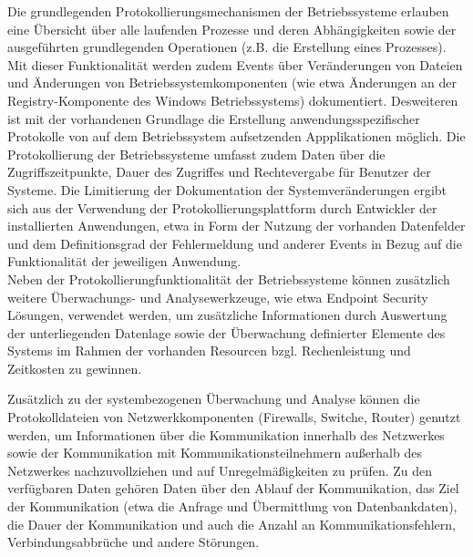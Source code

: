 Die grundlegenden Protokollierungsmechanismen der Betriebssysteme erlauben eine Übersicht über alle laufenden Prozesse und deren Abhängigkeiten sowie der ausgeführten grundlegenden Operationen (z.B. die Erstellung eines Prozesses). Mit dieser Funktionalität werden zudem Events über Veränderungen von Dateien und Änderungen von Betriebssystemkomponenten (wie etwa Änderungen an der Registry-Komponente des Windows Betriebssystems) dokumentiert. Desweiteren ist mit der vorhandenen Grundlage die Erstellung anwendungsspezifischer Protokolle von auf dem Betriebssystem aufsetzenden Appplikationen möglich. Die Protokollierung der Betriebssysteme umfasst zudem Daten über die Zugriffszeitpunkte, Dauer des Zugriffes und Rechtevergabe für Benutzer der Systeme. 
Die Limitierung der Dokumentation der Systemveränderungen ergibt sich aus der Verwendung der Protokollierungsplattform durch Entwickler der installierten Anwendungen, etwa in Form der Nutzung der vorhanden Datenfelder und dem Definitionsgrad der Fehlermeldung und anderer Events in Bezug auf die Funktionalität der jeweiligen Anwendung.\\ 

Neben der Protokollierungfunktionalität der Betriebssysteme können zusätzlich weitere Überwachungs- und Analysewerkzeuge, wie etwa Endpoint Security Lösungen, verwendet werden, um zusätzliche Informationen durch Auswertung der unterliegenden Datenlage sowie der Überwachung definierter Elemente des Systems im Rahmen der vorhanden Resourcen bzgl. Rechenleistung und Zeitkosten zu gewinnen. 

Zusätzlich zu der systembezogenen Überwachung und Analyse können die Protokolldateien von Netzwerkkomponenten (Firewalls, Switche, Router) genutzt werden, um Informationen über die Kommunikation innerhalb des Netzwerkes sowie der Kommunikation mit Kommunikationsteilnehmern außerhalb des Netzwerkes nachzuvollziehen und auf Unregelmäßigkeiten zu prüfen. Zu den verfügbaren Daten gehören Daten über den Ablauf der Kommunikation, das Ziel der Kommunikation (etwa die Anfrage und Übermittlung von Datenbankdaten), die Dauer der Kommunikation und auch die Anzahl an Kommunikationsfehlern, Verbindungsabbrüche und andere Störungen. 


